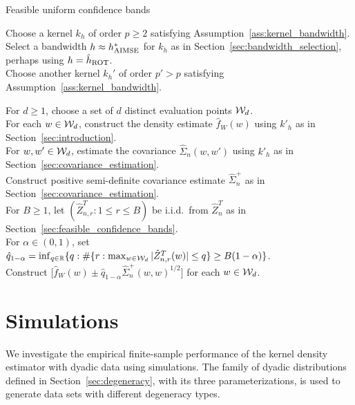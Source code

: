 \vspace*{2mm}
\begin{algorithm}[ht]
  \caption{Feasible uniform confidence bands}
  \label{alg:method}

  Choose a kernel $k_h$ of order $p \geq 2$ satisfying
  Assumption~\ref{ass:kernel_bandwidth}. \\

  Select a bandwidth $h \approx h^*_{\operatorname{AIMSE}}$ for $k_h$
  as in Section~\ref{sec:bandwidth_selection},
  perhaps using $h = \hat{h}_{\operatorname{ROT}}$. \\

  Choose another kernel $k_h'$ of order $p'>p$ satisfying
  Assumption~\ref{ass:kernel_bandwidth}.

  For $d \geq 1$, choose a set of $d$ distinct evaluation points $\mathcal{W}_d$. \\

  For each $w \in \mathcal{W}_d$, construct the density estimate $\hat f_W(w)$
  using $k'_{h}$ as in Section~\ref{sec:introduction}. \\

  For $w, w' \in \mathcal{W}_d$, estimate the covariance $\hat \Sigma_n(w,w')$
  using $k'_{h}$ as in Section~\ref{sec:covariance_estimation}. \\

  Construct positive semi-definite
  covariance estimate $\hat \Sigma_n^+$
  as in Section~\ref{sec:covariance_estimation}. \\

  For $B \geq 1$, let $(\hat Z_{n,r}^T: 1\leq r\leq B)$ be i.i.d.\
  from $\hat{Z}_n^T$ as in Section~\ref{sec:feasible_confidence_bands}. \\

  For $\alpha \in (0,1)$, set
  $\hat q_{1-\alpha} = \inf_{q \in \mathbb{R}}
  \{ q : \# \{r: \max_{w\in\mathcal{W}_d}|\hat Z_{n,r}^T(w)| \leq q \}
  \geq B(1-\alpha) \}$. \\

  Construct $ \big[\hat f_W(w) \pm
  \hat q_{1-\alpha} \hat\Sigma_n^+(w,w)^{1/2} \big]$ for each $w \in \mathcal{W}_d$.
\end{algorithm}

\section{Simulations}
\label{sec:simulations}

We investigate the empirical finite-sample performance of the kernel density
estimator with dyadic data using simulations. The family of dyadic
distributions defined in Section~\ref{sec:degeneracy}, with its three
parameterizations, is used to generate data sets with different degeneracy
types.

